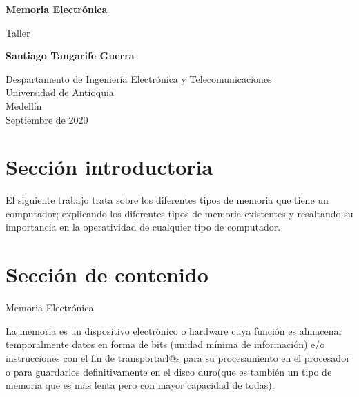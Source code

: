 \documentclass{article}
\begin{document}
\begin{titlepage}
    \begin{center}
        \vspace*{1cm}
        
        \Huge
        \textbf{Memoria Electrónica}
        
        \vspace{0.5cm}
        \LARGE
        Taller
            
        \vspace{1.5cm}
            
        \textbf{Santiago Tangarife Guerra}
            
        \vfill
            
        \vspace{0.8cm}
            
        \Large
        Despartamento de Ingeniería Electrónica y Telecomunicaciones\\
        Universidad de Antioquia\\
        Medellín\\
        Septiembre de 2020
            
    \end{center}
\end{titlepage}

\tableofcontents

\section{Sección introductoria}
El siguiente trabajo trata sobre los diferentes tipos de memoria que tiene un computador; explicando los diferentes tipos de memoria existentes y resaltando su importancia en la operatividad de cualquier tipo de computador.
\section{Sección de contenido} \label{contenido}
    \begin{center}
    \LARGE
        Memoria Electrónica
    \end{center}
    
La memoria es un dispositivo electrónico o hardware cuya función es almacenar temporalmente datos en forma de bits (unidad mínima de información) e/o instrucciones con el fin de transportarl@s para su procesamiento en el procesador o para guardarlos definitivamente en el disco duro(que es también un tipo de memoria que es más lenta pero con mayor capacidad de todas).
\end{document}

